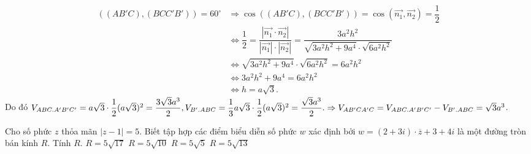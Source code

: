 \begin{ex}
{\begin{align*}
			\left((AB'C),(BCC'B')\right)=60^{\circ}&\Rightarrow \cos \left((AB'C),(BCC'B')\right)= \cos (\overrightarrow{n_1},\overrightarrow{n_2})=\dfrac{1}{2}\\
			&\Leftrightarrow \dfrac{1}{2}=\dfrac{\left|\overrightarrow{n_1}\cdot \overrightarrow{n_2}\right|}{\left|\overrightarrow{n_1}\right|\cdot \left|\overrightarrow{n_2}\right|}=\dfrac{3a^2h^2}{\sqrt{3a^2h^2+9a^4}\cdot \sqrt{6a^2h^2}}\\
			&\Leftrightarrow \sqrt{3a^2h^2+9a^4}\cdot \sqrt{6a^2h^2}=6a^2h^2\\ &\Leftrightarrow 3a^2h^2+9a^4=6a^2h^2\\
			&\Leftrightarrow h=a\sqrt{3}.
			\end{align*}
			Do đó $V_{ABC.A'B'C'}=a\sqrt{3}\cdot \dfrac{1}{2}(a\sqrt{3})^2=\dfrac{3\sqrt{3}a^3}{2}, V_{B'.ABC}=\dfrac{1}{3}a\sqrt{3}\cdot \dfrac{1}{2}(a\sqrt{3})^2=\dfrac{\sqrt{3}a^3}{2}. \\
			\Rightarrow V_{AB'CA'C}=V_{ABC.A'B'C'}-V_{B'.ABC}=\sqrt{3}a^3	$.	
	}
\end{ex}
\begin{ex}%
	Cho số phức $z$ thỏa mãn $|z-1|=5$. Biết tập hợp các điểm biểu diễn số phức $w$ xác định bởi $w=(2+3i)\cdot \overline{z}+3+4i$ là một đường tròn bán kính $R$. Tính $R$.
	\choice
	{$R=5\sqrt{17}$}
	{$R=5\sqrt{10}$}
	{$R=5\sqrt{5}$}
	{\True $R=5\sqrt{13}$} 
\end{ex}
